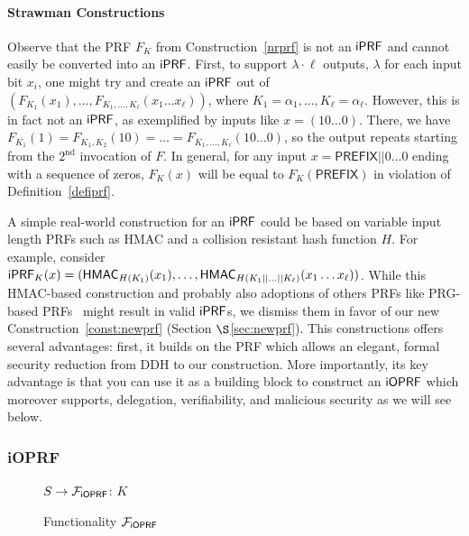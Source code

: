 \paragraph{Strawman Constructions}
Observe that the \citeauthor{prf} PRF $F_K$ from
Construction~\ref{nrprf} is not an $\mathsf{i}\mathsf{PRF}$ and cannot easily be
converted into an $\mathsf{i}\mathsf{PRF}$. First, to support $\lambda\cdot\ell$
outputs, $\lambda$ for each input bit $x_i$, one might try and create
an $\mathsf{i}\mathsf{PRF}$ out of
$(F_{K_1}(x_1),\ldots,F_{K_1,\ldots,K_\ell}(x_1\ldots{}x_\ell))$,
where $K_1=\alpha_1,\ldots,K_\ell=\alpha_\ell$.  However, this is in
fact not an $\mathsf{i}\mathsf{PRF}$, as exemplified by inputs like
$x=(10\ldots{}0)$. There, we have
$F_{K_1}(1)=F_{K_1,K_2}(10)=\ldots=F_{K_1,\ldots,K_\ell}(10\ldots{}0)$,
so the output repeats starting from the $2^\text{nd}$ invocation of
$F$. In general, for any input $x=\mathsf{PREFIX}||0\ldots{}0$ ending
with a sequence of zeros, $F_K(x)$ will be equal to
$F_K(\mathsf{PREFIX})$ in violation of Definition~\ref{defiprf}.

A simple real-world construction for an $\mathsf{i}\mathsf{PRF}$ could be based on
variable input length PRFs such as HMAC and a collision resistant hash
function $H$. For example, consider
$\mathsf{i}\mathsf{PRF}_K(x)=(\mathsf{HMAC}_{H(K_1)}(x_1),\ldots,\mathsf{HMAC}_{H(K_1||\ldots||K_\ell)}(x_1\ldots{}x_\ell))$.
While this HMAC-based construction and probably also adoptions of
others PRFs like PRG-based PRFs~\cite{ggm} might result in valid
$\mathsf{i}\mathsf{PRF}$s, we dismiss them in favor of our new
Construction~\ref{const:newprf} (Section $\S$\ref{sec:newprf}). This
constructions offers several advantages: first, it builds on the
\citeauthor{prf} PRF which allows an elegant, formal security
reduction from DDH to our construction. More importantly, its key
advantage is that you can use it as a building block to construct an
$\mathsf{i}\mathsf{OPRF}$ which moreover supports, delegation, verifiability, and
malicious security as we will see below.

\subsubsection{iOPRF}
\begin{figure}[tb]
\LinesNumbered
\begingroup
\removelatexerror%
\begin{functionality}[H]
  $S\rightarrow{}\mathcal{F}_{\mathsf{i}\mathsf{OPRF}}$: $K$\; 
\end{functionality}
\endgroup
\caption{Functionality $\mathcal{F}_{\mathsf{i}\mathsf{OPRF}}$\label{idealioprf}}
\end{figure}

